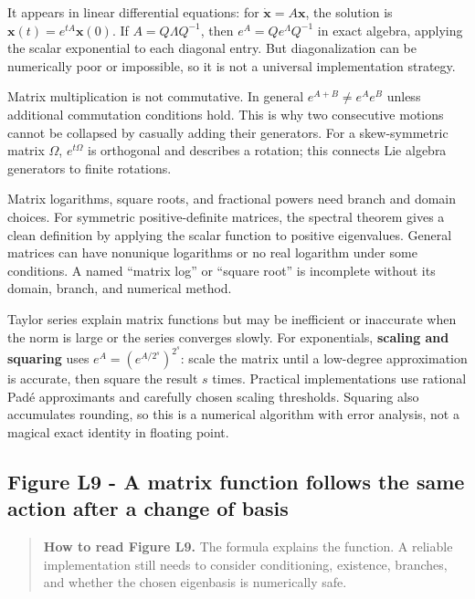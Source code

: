 It appears in linear differential equations: for \(\dot{\mathbf x}=A\mathbf x\), the solution is \(\mathbf x(t)=e^{tA}\mathbf x(0)\). If \(A=Q\Lambda Q^{-1}\), then \(e^A=Qe^\Lambda Q^{-1}\) in exact algebra, applying the scalar exponential to each diagonal entry. But diagonalization can be numerically poor or impossible, so it is not a universal implementation strategy.

Matrix multiplication is not commutative. In general \(e^{A+B}\ne e^Ae^B\) unless additional commutation conditions hold. This is why two consecutive motions cannot be collapsed by casually adding their generators. For a skew-symmetric matrix \(\Omega\), \(e^{t\Omega}\) is orthogonal and describes a rotation; this connects Lie algebra generators to finite rotations.

Matrix logarithms, square roots, and fractional powers need branch and domain choices. For symmetric positive-definite matrices, the spectral theorem gives a clean definition by applying the scalar function to positive eigenvalues. General matrices can have nonunique logarithms or no real logarithm under some conditions. A named ``matrix log'' or ``square root'' is incomplete without its domain, branch, and numerical method.

Taylor series explain matrix functions but may be inefficient or inaccurate when the norm is large or the series converges slowly. For exponentials, \textbf{scaling and squaring} uses \(e^A=(e^{A/2^s})^{2^s}\): scale the matrix until a low-degree approximation is accurate, then square the result \(s\) times. Practical implementations use rational Padé approximants and carefully chosen scaling thresholds. Squaring also accumulates rounding, so this is a numerical algorithm with error analysis, not a magical exact identity in floating point.

\subsection{Figure L9 - A matrix function follows the same action after a change of basis}\label{02-foundations-ii-ch026-figure-l9---a-matrix-function-follows-the-same-action-after-a-change-of-basis}

\hypertarget{02-foundations-ii-ch026-figure-l9---a-matrix-function-follows-the-same-action-after-a-change-of-basis}{}


\begin{quote}
\textbf{How to read Figure L9.} The formula explains the function. A reliable implementation still needs to consider conditioning, existence, branches, and whether the chosen eigenbasis is numerically safe.
\end{quote}

